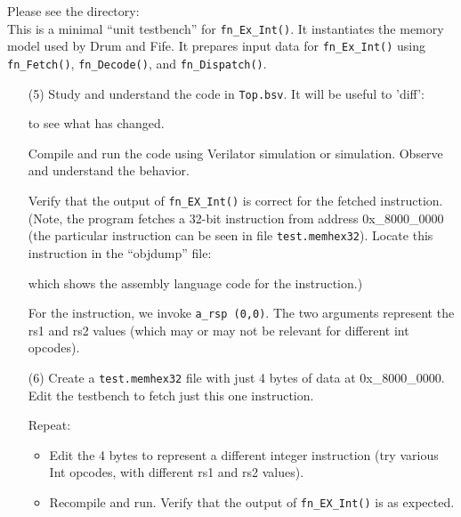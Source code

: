 Please see the directory:  \\
This is a minimal ``unit testbench'' for \verb|fn_Ex_Int()|.  It
instantiates the memory model used by Drum and Fife.  It prepares
input data for \verb|fn_Ex_Int()| using \verb|fn_Fetch()|,
\verb|fn_Decode()|, and \verb|fn_Dispatch()|.

\begin{itemize}

\item[(5)] Study and understand the code in \verb|Top.bsv|. It will be
    useful to 'diff':
    to see what has changed.

    Compile and run the code using Verilator simulation or {\BLUESIM}
    simulation.  Observe and understand the behavior.

    Verify that the output of \verb|fn_EX_Int()| is correct for the
    fetched instruction. (Note, the program fetches a 32-bit
    instruction from address 0x\_8000\_0000 (the particular
    instruction can be seen in file \verb|test.memhex32|).  Locate
    this instruction in the ``objdump'' file:


    which shows the assembly language code for the instruction.)

    For the instruction, we invoke \verb|a_rsp (0,0)|.  The two
    arguments represent the rs1 and rs2 values (which may or may not
    be relevant for different int opcodes).

\item[(6)] Create a \verb|test.memhex32| file with just 4 bytes of
    data at 0x\_8000\_0000.  Edit the testbench to fetch just this one
    instruction.

    Repeat:
    \begin{itemize}

    \item Edit the 4 bytes to represent a different integer instruction
        (try various Int opcodes, with different rs1 and rs2 values).

    \item Recompile and run. Verify that the output of
          \verb|fn_EX_Int()| is as expected.

    \end{itemize}

\end{itemize}

